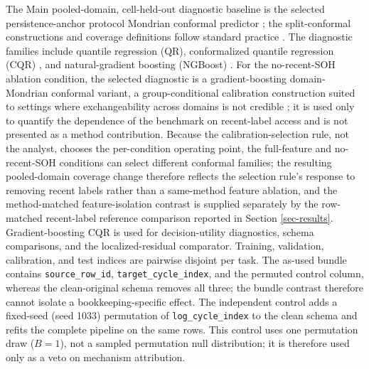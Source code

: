 \documentclass[
  number,
  preprint]{elsarticle}
\begin{document}
The Main pooled-domain, cell-held-out diagnostic baseline is the
selected persistence-anchor protocol Mondrian conformal predictor
\citep{vovk2005algorithmic}; the split-conformal constructions and
coverage definitions follow standard practice
\citep{angelopoulos2023conformal}. The diagnostic families include
quantile regression (QR), conformalized quantile regression (CQR)
\citep{romano2019conformalized}, and natural-gradient boosting (NGBoost)
\citep{duan2020ngboost}. For the no-recent-SOH ablation condition, the
selected diagnostic is a gradient-boosting domain-Mondrian conformal
variant, a group-conditional calibration construction suited to settings
where exchangeability across domains is not credible
\citep{barber2023beyond}; it is used only to quantify the dependence of
the benchmark on recent-label access and is not presented as a method
contribution. Because the calibration-selection rule, not the analyst,
chooses the per-condition operating point, the full-feature and
no-recent-SOH conditions can select different conformal families; the
resulting pooled-domain coverage change therefore reflects the selection
rule's response to removing recent labels rather than a same-method
feature ablation, and the method-matched feature-isolation contrast is
supplied separately by the row-matched recent-label reference comparison
reported in Section \ref{sec-results}. Gradient-boosting CQR is used for
decision-utility diagnostics, schema comparisons, and the
localized-residual comparator. Training, validation, calibration, and
test indices are pairwise disjoint per task. The as-used bundle contains
\texttt{source\_row\_id}, \texttt{target\_cycle\_index}, and the
permuted control column, whereas the clean-original schema removes all
three; the bundle contrast therefore cannot isolate a
bookkeeping-specific effect. The independent control adds a fixed-seed
(seed 1033) permutation of \texttt{log\_cycle\_index} to the clean
schema and refits the complete pipeline on the same rows. This control
uses one permutation draw (\(B=1\)), not a sampled permutation null
distribution; it is therefore used only as a veto on mechanism
attribution.
\end{document}
